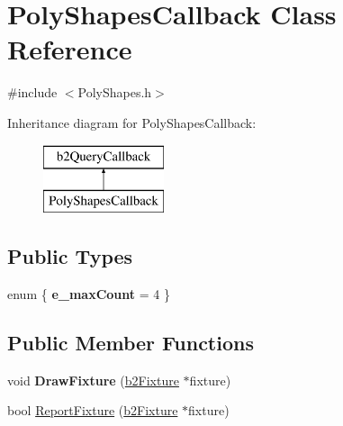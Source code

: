 \hypertarget{class_poly_shapes_callback}{\section{Poly\-Shapes\-Callback Class Reference}
\label{class_poly_shapes_callback}
}


{\ttfamily \#include $<$Poly\-Shapes.\-h$>$}

Inheritance diagram for Poly\-Shapes\-Callback\-:\begin{figure}[H]
\begin{center}
\leavevmode
\includegraphics[height=2.000000cm]{class_poly_shapes_callback}
\end{center}
\end{figure}
\subsection*{Public Types}
\begin{DoxyCompactItemize}
\item 
enum \{ {\bfseries e\-\_\-max\-Count} =  4
 \}
\end{DoxyCompactItemize}
\subsection*{Public Member Functions}
\begin{DoxyCompactItemize}
\item 
\hypertarget{class_poly_shapes_callback_ab9c43775294251bc109f0c8ccf57350c}{void {\bfseries Draw\-Fixture} (\hyperlink{classb2_fixture}{b2\-Fixture} $\ast$fixture)}\label{class_poly_shapes_callback_ab9c43775294251bc109f0c8ccf57350c}

\item 
bool \hyperlink{class_poly_shapes_callback_a35de1a0c75426d04a4a6f110e2ef03c8}{Report\-Fixture} (\hyperlink{classb2_fixture}{b2\-Fixture} $\ast$fixture)
\end{DoxyCompactItemize}
